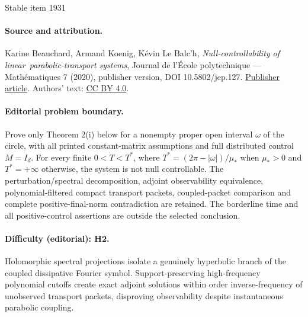 \documentclass[11pt]{article}
\begin{document}
\begin{center}{\Large Stable item 1931}\end{center}
\paragraph{Source and attribution.}
Karine Beauchard, Armand Koenig, Kévin Le Balc’h, \emph{Null-controllability of linear parabolic-transport systems}, Journal de l’École polytechnique — Mathématiques 7 (2020), publisher version, DOI 10.5802/jep.127. \href{https://jep.centre-mersenne.org/articles/10.5802/jep.127/}{Publisher article}. Authors' text: \href{https://creativecommons.org/licenses/by/4.0/}{CC BY 4.0}.
\paragraph{Editorial problem boundary.}
Prove only Theorem 2(i) below for a nonempty proper open interval \(\omega\) of the circle, with all printed constant-matrix assumptions and full distributed control \(M=I_d\). For every finite \(0<T<T^*\), where \(T^*=(2\pi-|\omega|)/\mu_*\) when \(\mu_*>0\) and \(T^*=+\infty\) otherwise, the system is not null controllable. The perturbation/spectral decomposition, adjoint observability equivalence, polynomial-filtered compact transport packets, coupled-packet comparison and complete positive-final-norm contradiction are retained. The borderline time and all positive-control assertions are outside the selected conclusion.
\paragraph{Difficulty (editorial): H2.}
Holomorphic spectral projections isolate a genuinely hyperbolic branch of the coupled dissipative Fourier symbol. Support-preserving high-frequency polynomial cutoffs create exact adjoint solutions within order inverse-frequency of unobserved transport packets, disproving observability despite instantaneous parabolic coupling.
\end{document}

